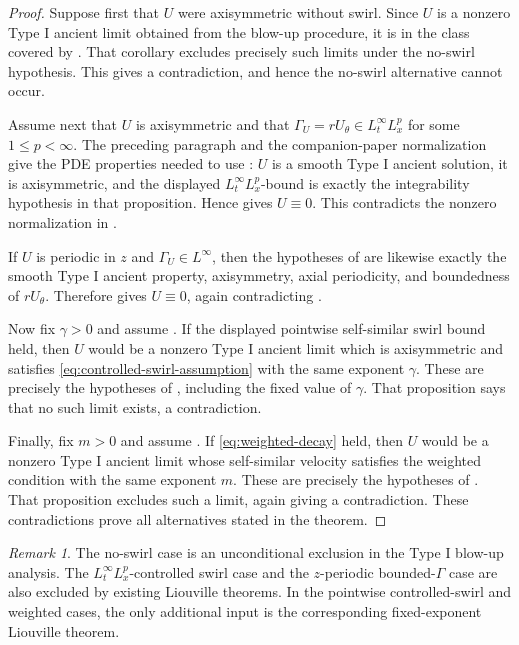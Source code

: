\documentclass[11pt]{amsart}
\theoremstyle{plain}
\theoremstyle{definition}
\theoremstyle{remark}
\newtheorem{remark}[theorem]{Remark}
\numberwithin{equation}{section}
\begin{document}
\begin{proof}
Suppose first that \(U\) were axisymmetric without swirl.  Since \(U\) is a
nonzero Type I ancient limit obtained from the blow-up procedure, it is in the
class covered by .  That corollary excludes
precisely such limits under the no-swirl hypothesis.  This gives a
contradiction, and hence the no-swirl alternative cannot occur.

Assume next that \(U\) is axisymmetric and that
\(\Gamma_U=rU_\theta\in L_t^\infty L_x^p\) for some \(1\le p<\infty\).
The preceding paragraph and the companion-paper normalization give the PDE
properties needed to use : \(U\) is a smooth
Type I ancient solution, it is axisymmetric, and the displayed
\(L_t^\infty L_x^p\)-bound is exactly the integrability hypothesis in that
proposition.  Hence  gives \(U\equiv0\).  This
contradicts the nonzero normalization in .

If \(U\) is periodic in \(z\) and \(\Gamma_U\in L^\infty\), then the
hypotheses of  are likewise exactly the
smooth Type I ancient property, axisymmetry, axial periodicity, and boundedness
of \(rU_\theta\).  Therefore  gives
\(U\equiv0\), again contradicting .

Now fix \(\gamma>0\) and assume .  If the displayed
pointwise self-similar swirl bound held, then \(U\) would be a nonzero Type I
ancient limit which is axisymmetric and satisfies
\eqref{eq:controlled-swirl-assumption} with the same exponent \(\gamma\).
These are precisely the hypotheses of , including
the fixed value of \(\gamma\).  That proposition says that no such limit
exists, a contradiction.

Finally, fix \(m>0\) and assume .  If
\eqref{eq:weighted-decay} held, then \(U\) would be a nonzero Type I ancient
limit whose self-similar velocity satisfies the weighted condition with the
same exponent \(m\).  These are precisely the hypotheses of
.  That proposition excludes such a limit, again
giving a contradiction.  These contradictions prove all alternatives stated in
the theorem.
\end{proof}

\begin{remark}\label{rem:relation-to-previous}
The no-swirl case is an unconditional exclusion in the Type I blow-up
analysis.  The \(L_t^\infty L_x^p\)-controlled swirl case and the
\(z\)-periodic bounded-\(\Gamma\) case are also excluded by existing Liouville
theorems.  In the pointwise controlled-swirl and weighted cases, the only
additional input is the corresponding fixed-exponent Liouville theorem.
\end{remark}
\end{document}
